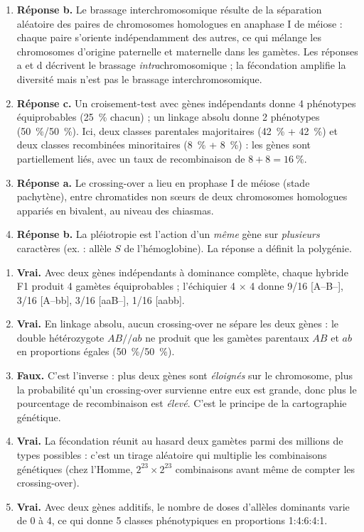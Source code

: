\documentclass[11pt]{article}
\newcommand{\cle}[1]{{\popxbold\color{popdark}#1}}
\begin{document}
\begin{corrige}
\begin{enumerate}
\item \textbf{Réponse b.} Le brassage interchromosomique résulte de la \cle{séparation aléatoire} des paires de chromosomes homologues en \cle{anaphase I} de méiose : chaque paire s'oriente indépendamment des autres, ce qui mélange les chromosomes d'origine paternelle et maternelle dans les gamètes. Les réponses a et d décrivent le brassage \emph{intra}chromosomique ; la fécondation amplifie la diversité mais n'est pas le brassage interchromosomique.
\item \textbf{Réponse c.} Un croisement-test avec gènes indépendants donne 4 phénotypes équiprobables (25~\% chacun) ; un linkage absolu donne 2 phénotypes (50~\%/50~\%). Ici, deux classes parentales majoritaires (42~\% + 42~\%) et deux classes recombinées minoritaires (8~\% + 8~\%) : les gènes sont \cle{partiellement liés}, avec un taux de recombinaison de $8 + 8 = 16~\%$.
\item \textbf{Réponse a.} Le crossing-over a lieu en \cle{prophase I} de méiose (stade pachytène), entre \cle{chromatides non sœurs} de deux chromosomes homologues appariés en bivalent, au niveau des chiasmas.
\item \textbf{Réponse b.} La \cle{pléiotropie} est l'action d'un \emph{même} gène sur \emph{plusieurs} caractères (ex. : allèle $S$ de l'hémoglobine). La réponse a définit la polygénie.
\end{enumerate}
\end{corrige}

\begin{corrige}
\begin{enumerate}
\item \textbf{Vrai.} Avec deux gènes indépendants à dominance complète, chaque hybride F1 produit 4 gamètes équiprobables ; l'échiquier 4 $\times$ 4 donne 9/16 [A--B--], 3/16 [A--bb], 3/16 [aaB--], 1/16 [aabb].
\item \textbf{Vrai.} En linkage absolu, aucun crossing-over ne sépare les deux gènes : le double hétérozygote $AB//ab$ ne produit que les gamètes parentaux $AB$ et $ab$ en proportions égales (50~\%/50~\%).
\item \textbf{Faux.} C'est l'inverse : plus deux gènes sont \emph{éloignés} sur le chromosome, plus la probabilité qu'un crossing-over survienne entre eux est grande, donc plus le pourcentage de recombinaison est \emph{élevé}. C'est le principe de la cartographie génétique.
\item \textbf{Vrai.} La fécondation réunit au hasard deux gamètes parmi des millions de types possibles : c'est un tirage aléatoire qui multiplie les combinaisons génétiques (chez l'Homme, $2^{23} \times 2^{23}$ combinaisons avant même de compter les crossing-over).
\item \textbf{Vrai.} Avec deux gènes additifs, le nombre de doses d'allèles dominants varie de 0 à 4, ce qui donne 5 classes phénotypiques en proportions 1:4:6:4:1.
\end{enumerate}
\end{corrige}
\end{document}
